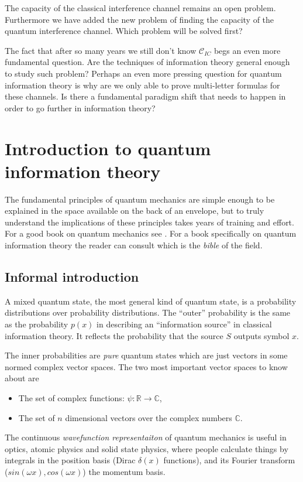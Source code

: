 \documentclass[aps,11pt,twoside,letterpaper]{article}
\def\c{\mathbb{C}}
\newcommand{\ICcap}{  \ensuremath{\mathcal C}_{IC} }
\begin{document}
        The capacity of the classical interference channel remains an open problem.
        Furthermore we have added the new problem of finding the capacity of the
        quantum interference channel. Which problem will be solved first?

	The fact that after so many years we still don't know $\ICcap$ begs 
	an even more fundamental question. 
	Are the techniques of information theory general enough to study such problem?
	Perhaps an even more pressing question for quantum information theory is why are we only
	able to prove multi-letter formulas for these channels.
	Is there a fundamental paradigm shift that needs to happen in order to go further in information theory?


\appendix


\section{Introduction to quantum information theory}           \label{section:intro_to_qit}


	The fundamental principles of quantum mechanics are simple enough to be explained in the space
	available on the back of an envelope, but to truly understand the implications of these
	principles takes years of training and effort.
	For a good book on quantum mechanics see \cite{sakurai}. 
	For a book specifically on quantum information theory the reader can consult \cite{NC04} which
	is the \emph{bible} of the field.

   
	   \subsection{Informal introduction}

	        A mixed quantum state, the most general kind of quantum state, is a
	        probability distributions over probability distributions.
	        The ``outer'' probability is the same as the probability $p(x)$ in describing 
	        an ``information source'' in classical information theory.
	        It reflects the probability that the source $S$ outputs symbol $x$.

	        The inner probabilities are \emph{pure} quantum states 
	        which are just vectors in some normed complex vector spaces.
	        The two most important vector spaces to know about are  
	        \begin{itemize}
	            \item   The set of complex functions: $\psi \colon \mathbb{R} \to \mathbb{C} $,
	            \item   The set of $n$ dimensional vectors over the complex numbers $\c$.
	        \end{itemize}
	        The continuous \emph{wavefunction representaiton} of quantum mechanics is useful in optics,
	        atomic physics and solid state physics, where people calculate things by integrals in 
	        the position basis (Dirac $\delta(x)$ functions),
	        and its Fourier transform ($sin(\omega x),cos(\omega x)$) the momentum basis.
\end{document}
